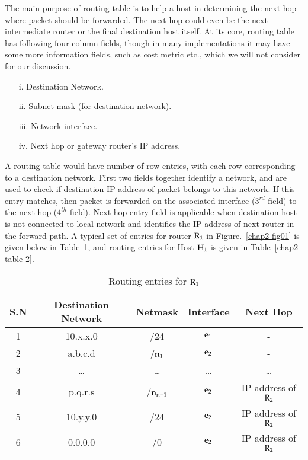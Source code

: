 \begin{multicols}{2}
The main purpose of routing table is to help a host in determining the next hop where packet should be forwarded. The next hop could even be the next intermediate router or the final destination host itself. At its core, routing table has following four column fields, though in many implementations it may have some more information fields, such as cost metric etc., which we will not consider for our discussion.
\begin{itemize}
\item[i.] Destination Network.
\item[ii.] Subnet mask (for destination network).
\item[iii.] Network interface.
\item[iv.] Next hop or gateway router’s IP address.
\end{itemize}

A routing table would have number of row entries, with each row corresponding to a destination network. First two fields together identify a network, and are used to check if destination IP address of packet belongs to this network. If this entry matches, then packet is forwarded on the associated interface ($3^{rd}$ field) to the next hop ($4^{th}$ field). Next hop entry field is applicable when destination host is not connected to local network and identifies the IP address of next router in the forward path.  A typical set of entries for router $\rm{R}_1$ in Figure.~\ref{chap2-fig01} is given below in Table~\ref{chap2-table-1}, and routing entries for Host $\rm{H}_1$ is given in Table~\ref{chap2-table-2}.

\begin{table}[H]
\caption{Routing entries for $\rm{R}_{1}$}\label{chap2-table-1}
\begin{tabular}{|c|c|c|c|c|}
\hline
\textbf{S.N} & \textbf{Destination Network} & \textbf{Netmask} & \textbf{Interface} & \textbf{Next Hop}\\
\hline
1 & 10.x.x.0 &/24 & $\rm{e}_{1}$ & -\\
\hline
2 & a.b.c.d &/$\rm{n}_{1}$ & $\rm{e}_{2}$ & -\\
\hline
3 & \dots & \dots & \dots & \dots\\
\hline
4 & p.q.r.s & /$\rm{n}_{\rm{n}-1}$ & $\rm{e}_{2}$ & IP address of $\rm{R}_{2}$\\
\hline
5 & 10.y.y.0 & /24 & $\rm{e}_{2}$ & IP address of $\rm{R}_{2}$\\
\hline
6 & 0.0.0.0 & /0 & $\rm{e}_{2}$ & IP address of $\rm{R}_{2}$\\
\hline
\end{tabular}
\end{table}


\end{multicols}
